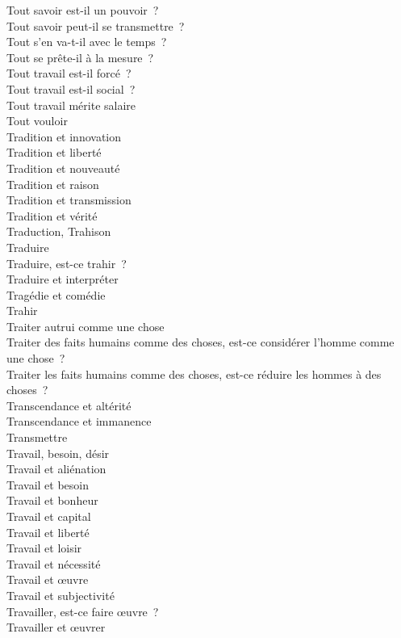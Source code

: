\documentclass[a4paper,12pt]{article}
\begin{document}
Tout savoir est-il un pouvoir ? \\
Tout savoir peut-il se transmettre ? \\
Tout s'en va-t-il avec le temps ? \\
Tout se prête-il à la mesure ? \\
Tout travail est-il forcé ? \\
Tout travail est-il social ? \\
Tout travail mérite salaire \\
Tout vouloir \\
Tradition et innovation \\
Tradition et liberté \\
Tradition et nouveauté \\
Tradition et raison \\
Tradition et transmission \\
Tradition et vérité \\
Traduction, Trahison \\
Traduire \\
Traduire, est-ce trahir ? \\
Traduire et interpréter \\
Tragédie et comédie \\
Trahir \\
Traiter autrui comme une chose \\
Traiter des faits humains comme des choses, est-ce considérer l'homme comme une chose ? \\
Traiter les faits humains comme des choses, est-ce réduire les hommes à des choses ? \\
Transcendance et altérité \\
Transcendance et immanence \\
Transmettre \\
Travail, besoin, désir \\
Travail et aliénation \\
Travail et besoin \\
Travail et bonheur \\
Travail et capital \\
Travail et liberté \\
Travail et loisir \\
Travail et nécessité \\
Travail et œuvre \\
Travail et subjectivité \\
Travailler, est-ce faire œuvre ? \\
Travailler et œuvrer \\
\end{document}
